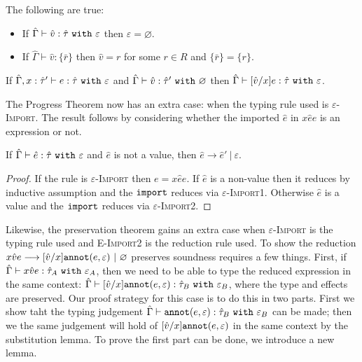 \begin{lemma}
The following are true:
\begin{itemize}
	\setlength\itemsep{-0.7em}
	\item If $\hat \Gamma \vdash \hat v: \hat \tau~\mathtt{with}~ \varepsilon$ then $\varepsilon = \varnothing$.
	\item If $\hat \Gamma \vdash \hat v: \{ \bar r \}$ then $\hat v = r$ for some $r \in R$ and $\{ \bar r \} = \{ r \}$.
\end{itemize}
\end{lemma}


\begin{lemma}[Substitution]
If $\hat \Gamma, x: \hat \tau' \vdash e: \hat \tau~\mathtt{with}~ \varepsilon$ and $\hat \Gamma \vdash \hat v: \hat \tau'~\mathtt{with}~ \varnothing$ then $\hat \Gamma \vdash [\hat v/x]e: \hat \tau~\mathtt{with}~ \varepsilon$.
\end{lemma}

The Progress Theorem now has an extra case: when the typing rule used is \textsc{$\varepsilon$-Import}. The result follows by considering whether the imported $\hat e$ in ${x}{\hat e}{e}$ is an expression or not.

\begin{theorem}[Progress]
If $\hat \Gamma \vdash \hat e: \hat \tau~\mathtt{with}~ \varepsilon$ and $\hat e$ is not a value, then $\hat e \longrightarrow \hat e'~|~\varepsilon$.
\end{theorem}

\begin{proof} If the rule is \textsc{$\varepsilon$-Import} then $e = {x}{\hat e}{e}$. If $\hat e$ is a non-value then it reduces by inductive assumption and the $\mathtt{import}$ reduces via \textsc{$\varepsilon$-Import1}. Otherwise $\hat e$ is a value and the $\mathtt{import}$ reduces via \textsc{$\varepsilon$-Import2}.
\end{proof}

Likewise, the preservation theorem gains an extra case when \textsc{$\varepsilon$-Import} is the typing rule used and \textsc{E-Import2} is the reduction rule used. To show the reduction ${x}{\hat v}{e} \longrightarrow [\hat v/x]\mathtt{annot}(e, \varepsilon)~|~\varnothing$ preserves soundness requires a few things. First, if $\hat \Gamma \vdash {x}{\hat v}{e}: \hat \tau_A~\mathtt{with}~ \varepsilon_A$, then we need to be able to type the reduced expression in the same context: $\hat \Gamma \vdash [\hat v/x]\mathtt{annot}(e, \varepsilon): \hat \tau_B~\mathtt{with}~ \varepsilon_B$, where the type and effects are preserved. Our proof strategy for this case is to do this in two parts. First we show taht the typing judgement $\hat \Gamma \vdash \mathtt{annot}(e, \varepsilon): \hat \tau_B~\mathtt{with}~ \varepsilon_B$ can be made; then we the same judgement will hold of $[\hat v/x]\mathtt{annot}(e, \varepsilon)$ in the same context by the substitution lemma. To prove the first part can be done, we introduce a new lemma.

